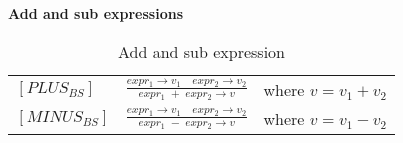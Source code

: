 \noindent \textbf{Add and sub expressions}

    \bgroup
    \def\arraystretch{3}
    \begin{table}[H]
    \centering
    \begin{tabular}{l c l}
        
        $[PLUS_{BS}]$ &$\frac{expr_1 \rightarrow v_1 \quad expr_2 \rightarrow v_2}{expr_1\;+\;expr_2 \rightarrow v}$ & where $v = v_1 + v_2$ \\
        
        $[MINUS_{BS}]$ &$\frac{expr_1 \rightarrow v_1 \quad expr_2 \rightarrow v_2}{expr_1\;-\;expr_2 \rightarrow v}$ & where $v = v_1 - v_2$ \\
        
    \end{tabular}
    \caption{Add and sub expression}
    \label{tab:addandsub}
    \end{table}
    \egroup

    
    
  